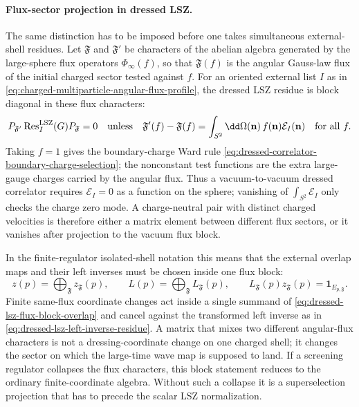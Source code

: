 \paragraph{Flux-sector projection in dressed LSZ.}
The same distinction has to be imposed before one takes simultaneous
external-shell residues.  Let \(\mathfrak F\) and \(\mathfrak F'\) be
characters of the abelian algebra generated by the large-sphere flux
operators \(\Phi_\infty(f)\), so that \(\mathfrak F(f)\) is the angular
Gauss-law flux of the initial charged sector tested against \(f\).  For an
oriented external list \(I\) as in
\eqref{eq:charged-multiparticle-angular-flux-profile}, the dressed LSZ
residue is block diagonal in these flux characters:
\begin{equation}
  P_{\mathfrak F'}\operatorname{Res}_{I}^{\rm LSZ}(G)P_{\mathfrak F}
  =
  0
  \quad\text{unless}\quad
  \mathfrak F'(f)-\mathfrak F(f)
  =
  \int_{S^2}\dd\Omega(\mathbf n)\,
  f(\mathbf n)\mathcal E_I(\mathbf n)
  \quad\text{for all }f .
  \label{eq:dressed-lsz-flux-sector-selection}
\end{equation}
Taking \(f=1\) gives the boundary-charge Ward rule
\eqref{eq:dressed-correlator-boundary-charge-selection}; the nonconstant
test functions are the extra large-gauge charges carried by the angular flux.
Thus a vacuum-to-vacuum dressed correlator requires
\(\mathcal E_I=0\) as a function on the sphere; vanishing of
\(\int_{S^2}\mathcal E_I\) only checks the charge zero mode.  A
charge-neutral pair with distinct charged velocities is therefore either a
matrix element between different flux sectors, or it vanishes after
projection to the vacuum flux block.

In the finite-regulator isolated-shell notation this means that the external
overlap maps and their left inverses must be chosen inside one flux block:
\begin{equation}
  z(p)=\bigoplus_{\mathfrak F} z_{\mathfrak F}(p),
  \qquad
  L(p)=\bigoplus_{\mathfrak F} L_{\mathfrak F}(p),
  \qquad
  L_{\mathfrak F}(p)z_{\mathfrak F}(p)=\mathbf 1_{E_{p,\mathfrak F}} .
  \label{eq:dressed-lsz-flux-block-overlap}
\end{equation}
Finite same-flux coordinate changes act inside a single summand of
\eqref{eq:dressed-lsz-flux-block-overlap} and cancel against the transformed
left inverse as in \eqref{eq:dressed-lsz-left-inverse-residue}.  A matrix
that mixes two different angular-flux characters is not a dressing-coordinate
change on one charged shell; it changes the sector on which the large-time
wave map is supposed to land.  If a screening regulator collapses the flux
characters, this block statement reduces to the ordinary finite-coordinate
algebra.  Without such a collapse it is a superselection projection that has
to precede the scalar LSZ normalization.

